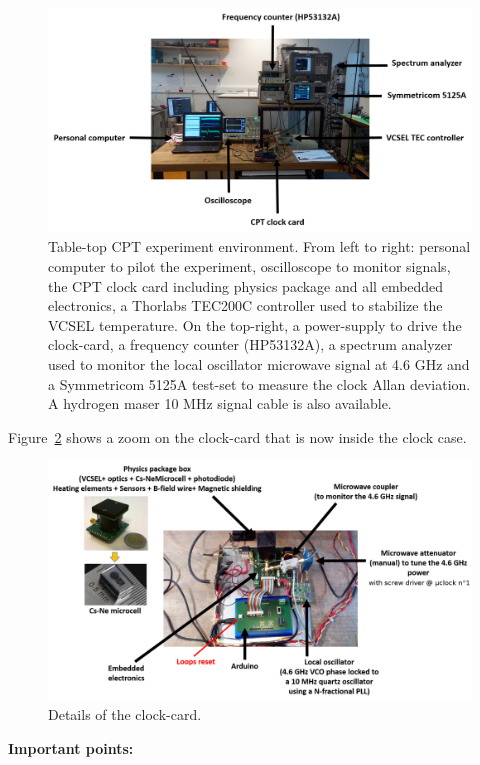\documentclass[a4paper,11pt]{article}
\begin{document}
\begin{figure}[h!]
	\centering
	\includegraphics[width=0.9\linewidth]{environnement}
	\caption{Table-top CPT experiment environment. From left to right: personal computer to pilot the experiment, 		oscilloscope to monitor signals, the CPT clock card including physics package and all embedded electronics, a Thorlabs 		TEC200C controller used to stabilize the VCSEL temperature. On the top-right, a power-supply to drive the clock-card, 		a frequency counter (HP53132A), a spectrum analyzer used to monitor the local oscillator microwave signal at 4.6 GHz 		and a Symmetricom 5125A test-set to measure the clock Allan deviation. A hydrogen maser 10 MHz signal cable is also 		available.}
	\label{fig:environnement}
\end{figure}

Figure~\ref{fig:clock-card} shows a zoom on the clock-card that is now inside the clock case.

\begin{figure}[h!]
	\centering
	\includegraphics[width=0.9\linewidth]{clock-card}
	\caption{Details of the clock-card.}
	\label{fig:clock-card}
\end{figure}


{\bf Important points: }
\end{document}
